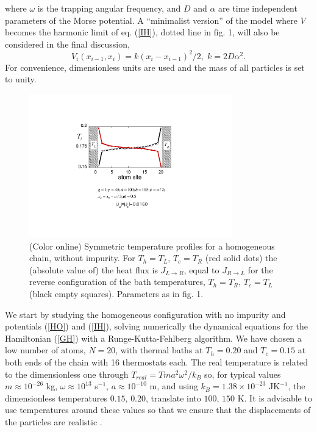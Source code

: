 %
where $\omega$ is the trapping angular frequency, and $D$ and $\alpha$ are time independent parameters of the Morse potential.
A ``minimalist version'' of the model where $V$ becomes the harmonic limit of eq. (\ref{IH}), dotted line in fig. 1,
 will also be considered in the final discussion,
%
\begin{equation}
\label{Vhar}
{V}_i(x_{i-1},x_i)=k(x_i-x_{i-1})^2/2,\;k=2D\alpha^2.
\end{equation}
%
For convenience, dimensionless units are used and the mass of all particles is set to unity.
\begin{figure}
\centering
\includegraphics[width=8.8cm]{Figures/FIG2.pdf}
\caption{(Color online) Symmetric temperature profiles for a homogeneous chain, without impurity.  For $T_{h}=T_{L}$, $T_c=T_R$ (red solid dots) the (absolute value of) the heat flux is $J_{L\rightarrow R}$, equal to $J_{R\rightarrow L}$ for the reverse configuration of the bath temperatures, $T_{h}=T_{R}$, $T_c=T_L$
(black empty squares). Parameters as in fig. 1.}
\label{figure2}
\end{figure}

We start by studying the homogeneous configuration with no impurity and potentials (\ref{HO}) and (\ref{IH}), solving numerically the dynamical equations for  the Hamiltonian (\ref{GH}) with a Runge-Kutta-Fehlberg algorithm. We have chosen a low number of atoms, $N=20$,  with thermal baths at $T_h=0.20$ and $T_c=0.15$ at both ends of the chain with 16 thermostats each. The real temperature is related to the dimensionless one through $T_{real}=T m a^2 \omega^2/k_B$ so, for typical values  $m\approx10^{-26}$ kg, $\omega \approx 10^{13}$ s$^{-1}$, $a\approx 10^{-10}$ m, and using $k_B =1.38 \times 10^{-23}$ JK$^{-1}$,
the dimensionless temperatures $0.15,\, 0.20$, translate into $100,\, 150$ K. It is advisable to use temperatures around these values so that we ensure that the displacements of the particles are realistic \cite{Casati1984}.


